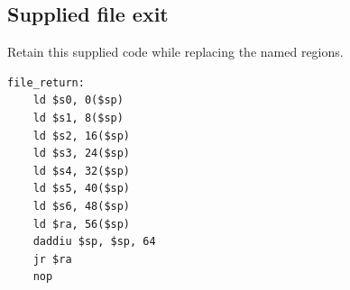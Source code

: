 \subsection*{Supplied file exit}
Retain this supplied code while replacing the named regions.

\begin{verbatim}
file_return:
    ld $s0, 0($sp)
    ld $s1, 8($sp)
    ld $s2, 16($sp)
    ld $s3, 24($sp)
    ld $s4, 32($sp)
    ld $s5, 40($sp)
    ld $s6, 48($sp)
    ld $ra, 56($sp)
    daddiu $sp, $sp, 64
    jr $ra
    nop

\end{verbatim}
